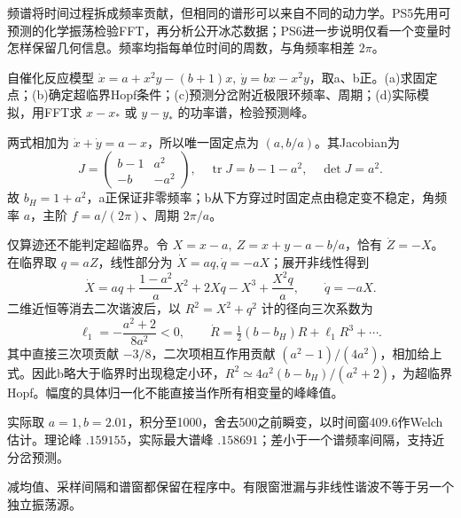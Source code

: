 频谱将时间过程拆成频率贡献，但相同的谱形可以来自不同的动力学。PS5先用可预测的化学振荡检验FFT，再分析公开冰芯数据；PS6进一步说明仅看一个变量时怎样保留几何信息。频率均指每单位时间的周数，与角频率相差 $2\pi$。

\begin{exercise}\label{task:chaos-PS5-1}
自催化反应模型 $\dot x=a+x^2y-(b+1)x,\ \dot y=bx-x^2y$，取a、b正。(a)求固定点；(b)确定超临界Hopf条件；(c)预测分岔附近极限环频率、周期；(d)实际模拟，用FFT求 $x-x_*$ 或 $y-y_*$ 的功率谱，检验预测峰。
\end{exercise}
\begin{solution}
两式相加为 $\dot x+\dot y=a-x$，所以唯一固定点为 $(a,b/a)$。其Jacobian为
\[
 J=\begin{pmatrix}b-1&a^2\\-b&-a^2\end{pmatrix},\quad
 \operatorname{tr}J=b-1-a^2,\quad\det J=a^2.
\]
故 $b_H=1+a^2$，a正保证非零频率；b从下方穿过时固定点由稳定变不稳定，角频率 $a$，主阶 $f=a/(2\pi)$、周期 $2\pi/a$。

仅算迹还不能判定超临界。令 $X=x-a,\ Z=x+y-a-b/a$，恰有 $\dot Z=-X$。在临界取 $q=aZ$，线性部分为 $\dot X=aq,\dot q=-aX$；展开非线性得到
\[
 \dot X=aq+\frac{1-a^2}{a}X^2+2Xq-X^3+\frac{X^2q}{a},\qquad \dot q=-aX.
\]
二维近恒等消去二次谐波后，以 $R^2=X^2+q^2$ 计的径向三次系数为
\[
 \ell_1=-\frac{a^2+2}{8a^2}<0,\qquad
 \dot R=\tfrac12(b-b_H)R+\ell_1R^3+\cdots.
\]
其中直接三次项贡献 $-3/8$，二次项相互作用贡献 $(a^2-1)/(4a^2)$，相加给上式。因此b略大于临界时出现稳定小环，$R^2\simeq4a^2(b-b_H)/(a^2+2)$，为超临界Hopf。幅度的具体归一化不能直接当作所有相变量的峰峰值。

实际取 $a=1,b=2.01$，积分至1000，舍去500之前瞬变，以时间窗409.6作Welch估计。理论峰 $.159155$，实际最大谱峰 $.158691$；差小于一个谱频率间隔，支持近分岔预测。
\begin{center}\hfill{}\end{center}
减均值、采样间隔和谱窗都保留在程序中。有限窗泄漏与非线性谐波不等于另一个独立振荡源。
\end{solution}

